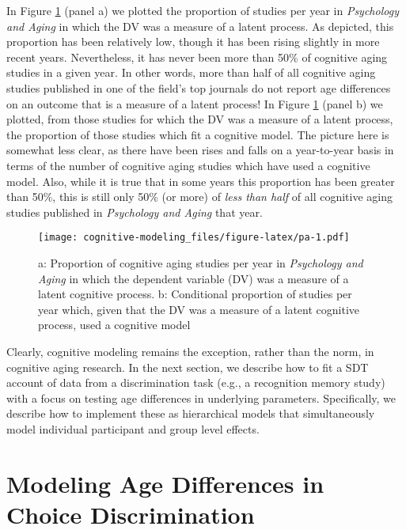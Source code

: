 \documentclass[
  english,
  ,man,floatsintext]{apa6}
\begin{document}
In Figure \ref{fig:pa} (panel a) we plotted the proportion of studies per year in \emph{Psychology and Aging} in which the DV was a measure of a latent process. As depicted, this proportion has been relatively low, though it has been rising slightly in more recent years. Nevertheless, it has never been more than 50\% of cognitive aging studies in a given year. In other words, more than half of all cognitive aging studies published in one of the field's top journals do not report age differences on an outcome that is a measure of a latent process! In Figure \ref{fig:pa} (panel b) we plotted, from those studies for which the DV was a measure of a latent process, the proportion of those studies which fit a cognitive model. The picture here is somewhat less clear, as there have been rises and falls on a year-to-year basis in terms of the number of cognitive aging studies which have used a cognitive model. Also, while it is true that in some years this proportion has been greater than 50\%, this is still only 50\% (or more) of \emph{less than half} of all cognitive aging studies published in \emph{Psychology and Aging} that year.

\begin{figure}
\centering
\texttt{[image: cognitive-modeling\_files/figure-latex/pa-1.pdf]}
\caption{\label{fig:pa}a: Proportion of cognitive aging studies per year in \emph{Psychology and Aging} in which the dependent variable (DV) was a measure of a latent cognitive process. b: Conditional proportion of studies per year which, given that the DV was a measure of a latent cognitive process, used a cognitive model}
\end{figure}

Clearly, cognitive modeling remains the exception, rather than the norm, in cognitive aging research. In the next section, we describe how to fit a SDT account of data from a discrimination task (e.g., a recognition memory study) with a focus on testing age differences in underlying parameters. Specifically, we describe how to implement these as hierarchical models that simultaneously model individual participant and group level effects.

\hypertarget{modeling-age-differences-in-choice-discrimination}{%
\section{Modeling Age Differences in Choice Discrimination}\label{modeling-age-differences-in-choice-discrimination}}
\end{document}
